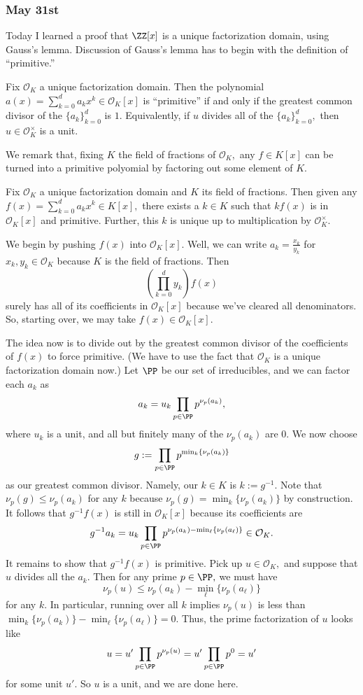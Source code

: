 \subsubsection{May 31st}
Today I learned a proof that $\ZZ[x]$ is a unique factorization domain, using Gauss's lemma. Discussion of Gauss's lemma has to begin with the definition of ``primitive.''
\begin{definition}
    Fix $\mathcal O_K$ a unique factorization domain. Then the polynomial $a(x)=\sum_{k=0}^da_kx^k\in\mathcal O_K[x]$ is ``primitive'' if and only if the greatest common divisor of the $\{a_k\}_{k=0}^d$ is $1.$ Equivalently, if $u$ divides all of the $\{a_k\}_{k=0}^d,$ then $u\in\mathcal O_K^\times$ is a unit.
\end{definition}
We remark that, fixing $K$ the field of fractions of $\mathcal O_K,$ any $f\in K[x]$ can be turned into a primitive polyomial by factoring out some element of $K.$
\begin{lemma}
    Fix $\mathcal O_K$ a unique factorization domain and $K$ its field of fractions. Then given any $f(x)=\sum_{k=0}^da_kx^k\in K[x],$ there exists a $k\in K$ such that $kf(x)$ is in $\mathcal O_K[x]$ and primitive. Further, this $k$ is unique up to multiplication by $\mathcal O_K^\times.$
\end{lemma}
We begin by pushing $f(x)$ into $\mathcal O_K[x].$ Well, we can write $a_k=\frac{x_k}{y_k}$ for $x_k,y_k\in\mathcal O_K$ because $K$ is the field of fractions. Then
\[\left(\prod_{k=0}^dy_k\right)f(x)\]
surely has all of its coefficients in $\mathcal O_K[x]$ because we've cleared all denominators. So, starting over, we may take $f(x)\in\mathcal O_K[x].$

The idea now is to divide out by the greatest common divisor of the coefficients of $f(x)$ to force primitive. (We have to use the fact that $\mathcal O_K$ is a unique factorization domain now.) Let $\PP$ be our set of irreducibles, and we can factor each $a_k$ as
\[a_k=u_k\prod_{p\in\PP}p^{\nu_p(a_k)},\]
where $u_k$ is a unit, and all but finitely many of the $\nu_p(a_k)$ are $0.$ We now choose
\[g:=\prod_{p\in\PP}p^{\min_k\{\nu_p(a_k)\}}\]
as our greatest common divisor. Namely, our $k\in K$ is $k:=g^{-1}.$ Note that $\nu_p(g)\le\nu_p(a_k)$ for any $k$ because $\nu_p(g)=\min_k\{\nu_p(a_k)\}$ by construction. It follows that $g^{-1}f(x)$ is still in $\mathcal O_K[x]$ because its coefficients are
\[g^{-1}a_k=u_k\prod_{p\in\PP}p^{\nu_p(a_k)-\min_\ell\{\nu_p(a_\ell)\}}\in\mathcal O_K.\]
It remains to show that $g^{-1}f(x)$ is primitive. Pick up $u\in\mathcal O_K,$ and suppose that $u$ divides all the $a_k.$ Then for any prime $p\in\PP,$ we must have
\[\nu_p(u)\le\nu_p(a_k)-\min_\ell\{\nu_p(a_\ell)\}\]
for any $k.$ In particular, running over all $k$ implies $\nu_p(u)$ is less than $\min_k\{\nu_p(a_k)\}-\min_\ell\{\nu_p(a_\ell)\}=0.$ Thus, the prime factorization of $u$ looks like
\[u=u'\prod_{p\in\PP}p^{\nu_p(u)}=u'\prod_{p\in\PP}p^0=u'\]
for some unit $u'.$ So $u$ is a unit, and we are done here.

